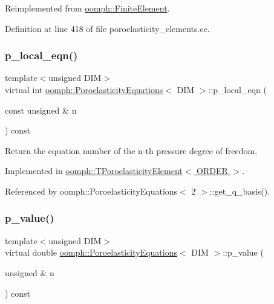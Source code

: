 Reimplemented from \hyperlink{classoomph_1_1FiniteElement_a2a8426dccd57b927be0ae0eec00d0479}{oomph\+::\+Finite\+Element}.



Definition at line 418 of file poroelasticity\+\_\+elements.\+cc.

\mbox{\label{classoomph_1_1PoroelasticityEquations_a98642c2cf0e476f4068c12d1fc8b61b9}} 
\subsubsection{\texorpdfstring{p\+\_\+local\+\_\+eqn()}{p\_local\_eqn()}}
{\footnotesize\ttfamily template$<$unsigned D\+IM$>$ \\
virtual int \hyperlink{classoomph_1_1PoroelasticityEquations}{oomph\+::\+Poroelasticity\+Equations}$<$ D\+IM $>$\+::p\+\_\+local\+\_\+eqn (\begin{DoxyParamCaption}\item[{const unsigned \&}]{n }\end{DoxyParamCaption}) const\hspace{0.3cm}{\ttfamily [pure virtual]}}



Return the equation number of the n-\/th pressure degree of freedom. 



Implemented in \hyperlink{classoomph_1_1TPoroelasticityElement_a4c1290c4e7fd01b244ec46728e5c47f1}{oomph\+::\+T\+Poroelasticity\+Element$<$ O\+R\+D\+E\+R $>$}.



Referenced by oomph\+::\+Poroelasticity\+Equations$<$ 2 $>$\+::get\+\_\+q\+\_\+basis().

\mbox{\label{classoomph_1_1PoroelasticityEquations_abe547474535cb139acd45cc69e251516}} 
\subsubsection{\texorpdfstring{p\+\_\+value()}{p\_value()}}
{\footnotesize\ttfamily template$<$unsigned D\+IM$>$ \\
virtual double \hyperlink{classoomph_1_1PoroelasticityEquations}{oomph\+::\+Poroelasticity\+Equations}$<$ D\+IM $>$\+::p\+\_\+value (\begin{DoxyParamCaption}\item[{unsigned \&}]{n }\end{DoxyParamCaption}) const\hspace{0.3cm}{\ttfamily [pure virtual]}}



